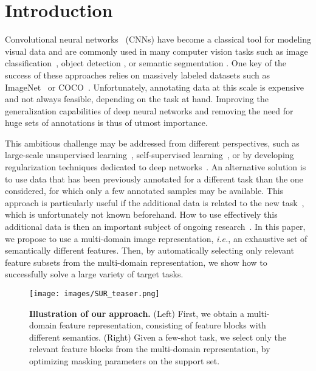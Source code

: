 \documentclass[runningheads]{llncs}
\begin{document}
\section{Introduction}
Convolutional neural networks~\cite{lecun1989backpropagation} (CNNs) have become
a classical tool for modeling visual data and are commonly used in
many computer vision tasks such as image
classification~\cite{krizhevsky2012imagenet}, object detection
\cite{blitznet,ssd,faster-rcnn}, or semantic segmentation
\cite{blitznet,long2015fully,ronneberger2015u}. One key of the success of 
these approaches relies on 
massively labeled datasets
such as ImageNet~\cite{imagenet} or COCO~\cite{coco}.
Unfortunately, annotating data at this scale is expensive and not always
feasible, depending on the task at hand. Improving the generalization
capabilities of deep neural networks and removing the need for huge sets of
annotations is thus of utmost importance.

This ambitious challenge may be addressed from different perspectives, such as
large-scale unsupervised learning~\cite{caron2018deep}, self-supervised
learning~\cite{doersch2017multi,gidaris2018unsupervised}, or by developing
regularization techniques dedicated to deep
networks~\cite{bietti2019kernel,yoshida2017spectral}. An alternative solution is
to use data that has been previously annotated for a different task than the one considered,
for which only a few annotated samples may be available.
This approach is particularly
useful if the additional data is related to
the new task~\cite{yosinski2014transferable,vtab}, which is unfortunately not known beforehand.
How to use effectively this additional data is then an important subject of ongoing
research~\cite{finn2017model,triantafillou2019meta,vtab}. In this paper, we
propose to use a multi-domain image representation, \textit{i.e.}, an
exhaustive set of semantically different features. Then, by automatically selecting only relevant
feature subsets from the multi-domain representation, we show 
how to successfully solve a large variety of target tasks.

\begin{figure}[t]
   \centering
  \texttt{[image: images/SUR\_teaser.png]}
\caption{\textbf{Illustration of our approach.} (Left) First, we obtain a
  multi-domain feature representation, consisting of feature blocks with different
  semantics. (Right) Given a few-shot task, we select only the relevant
  feature blocks from the multi-domain representation, by optimizing masking
  parameters  on the support set.}\label{fig:sketch_relationships}
\end{figure}
\end{document}

